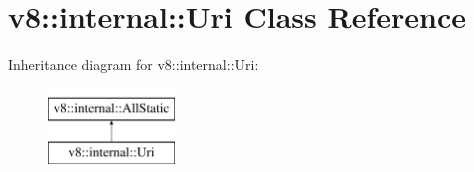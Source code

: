 \hypertarget{classv8_1_1internal_1_1Uri}{}\section{v8\+:\+:internal\+:\+:Uri Class Reference}
\label{classv8_1_1internal_1_1Uri}
Inheritance diagram for v8\+:\+:internal\+:\+:Uri\+:\begin{figure}[H]
\begin{center}
\leavevmode
\includegraphics[height=2.000000cm]{classv8_1_1internal_1_1Uri}
\end{center}
\end{figure}
